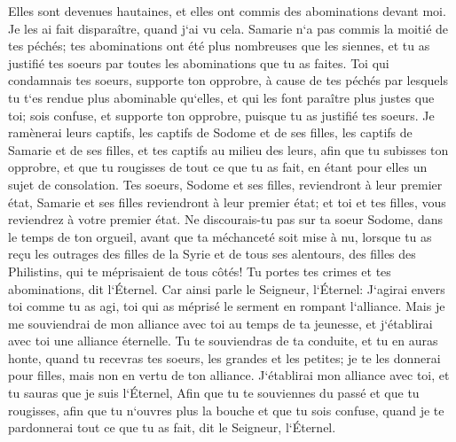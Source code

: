 \verse Elles sont devenues hautaines, et elles ont commis des abominations devant moi. Je les ai fait disparaître, quand j`ai vu cela. 
\verse Samarie n`a pas commis la moitié de tes péchés; tes abominations ont été plus nombreuses que les siennes, et tu as justifié tes soeurs par toutes les abominations que tu as faites. 
\verse Toi qui condamnais tes soeurs, supporte ton opprobre, à cause de tes péchés par lesquels tu t`es rendue plus abominable qu`elles, et qui les font paraître plus justes que toi; sois confuse, et supporte ton opprobre, puisque tu as justifié tes soeurs. 
\verse Je ramènerai leurs captifs, les captifs de Sodome et de ses filles, les captifs de Samarie et de ses filles, et tes captifs au milieu des leurs, 
\verse afin que tu subisses ton opprobre, et que tu rougisses de tout ce que tu as fait, en étant pour elles un sujet de consolation. 
\verse Tes soeurs, Sodome et ses filles, reviendront à leur premier état, Samarie et ses filles reviendront à leur premier état; et toi et tes filles, vous reviendrez à votre premier état. 
\verse Ne discourais-tu pas sur ta soeur Sodome, dans le temps de ton orgueil, 
\verse avant que ta méchanceté soit mise à nu, lorsque tu as reçu les outrages des filles de la Syrie et de tous ses alentours, des filles des Philistins, qui te méprisaient de tous côtés! 
\verse Tu portes tes crimes et tes abominations, dit l`Éternel. 
\verse Car ainsi parle le Seigneur, l`Éternel: J`agirai envers toi comme tu as agi, toi qui as méprisé le serment en rompant l`alliance. 
\verse Mais je me souviendrai de mon alliance avec toi au temps de ta jeunesse, et j`établirai avec toi une alliance éternelle. 
\verse Tu te souviendras de ta conduite, et tu en auras honte, quand tu recevras tes soeurs, les grandes et les petites; je te les donnerai pour filles, mais non en vertu de ton alliance. 
\verse J`établirai mon alliance avec toi, et tu sauras que je suis l`Éternel, 
\verse Afin que tu te souviennes du passé et que tu rougisses, afin que tu n`ouvres plus la bouche et que tu sois confuse, quand je te pardonnerai tout ce que tu as fait, dit le Seigneur, l`Éternel. 

\chapter{}

